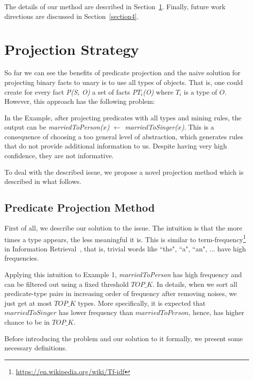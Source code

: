 \documentclass{acm_proc_article-sp}
\begin{document}
The details of our method are described in Section~\ref{section2}. Finally, future work directions are discussed in Section~\ref{section4}.

\section{Projection Strategy}
\label{section2}

So far we can see the benefits of predicate projection and the naive solution for projecting binary facts to unary is to use all types of objects. That is, one could create for every fact \textit{P(S, O)} a set of facts \textit{P$T_{i}$(O)} where \textit{$T_{i}$} is a type of $O$. However, this approach has the following problem:

In the Example, after projecting predicates with all types and mining rules, the output can be \textit{marriedToPerson($x$) $\leftarrow$ marriedToSinger($x$)}. This is a consequence of choosing a too general level of abstraction, which generates rules that do not provide additional information to us. Despite having very high confidence, they are not informative.

To deal with the described issue, we propose a novel projection method which is described in what follows.

\subsection{Predicate Projection Method}
\label{section21}

First of all, we describe our solution to the issue. The intuition is that the more times a type appears, the less meaningful it is. This is similar to term-frequency\footnote{\url{https://en.wikipedia.org/wiki/Tf-idf}} in Information Retrieval~\cite{ref2}, that is, trivial words like ``the", ``a", ``an", ... have high frequencies.

Applying this intuition to Example 1, \textit{marriedToPerson} has high frequency and can be filtered out using a fixed threshold $TOP\_K$. In details, when we sort all predicate-type pairs in increasing order of frequency after removing noises, we just get at most $TOP\_K$ types. More specifically, it is expected that $marriedToSinger$ has lower frequency than $marriedToPerson$, hence, has higher chance to be in $TOP\_K$.

Before introducing the problem and our solution to it formally, we present some necessary definitions.
\end{document}
